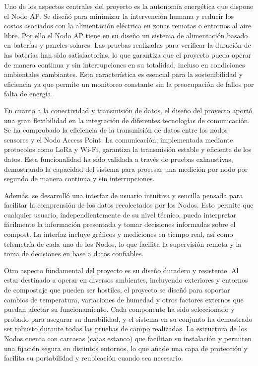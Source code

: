 Uno de los aspectos centrales del proyecto es la autonomía energética que dispone el Nodo AP. Se diseñó para minimizar la intervención humana y reducir los costos asociados con la alimentación eléctrica en zonas remotas o entornos al aire libre. Por ello el Nodo AP tiene en su diseño un sistema de alimentación basado en baterías y paneles solares. Las pruebas realizadas para verificar la duración de las baterías han sido satisfactorias, lo que garantiza que el proyecto pueda operar de manera continua y sin interrupciones en su totalidad, incluso en condiciones ambientales cambiantes. Esta característica es esencial para la sostenibilidad y eficiencia ya que permite un monitoreo constante sin la preocupación de fallos por falta de energía.

En cuanto a la conectividad y transmisión de datos, el diseño del proyecto aportó una gran flexibilidad  en la integración de diferentes tecnologías de comunicación. Se ha comprobado la eficiencia de la transmisión de datos entre los nodos sensores y el Nodo Access Point. La comunicación, implementada mediante protocolos como LoRa y Wi-Fi, garantiza la transmisión estable y eficiente de los datos. Esta funcionalidad ha sido validada a través de pruebas exhaustivas, demostrando la capacidad del sistema para procesar una medición por nodo por segundo de manera continua y sin interrupciones.

Además, se desarrolló una interfaz de usuario intuitiva y sencilla pensada para facilitar la comprensión de los datos recolectados por los Nodos. Esto permite que cualquier usuario, independientemente de su nivel técnico, pueda interpretar fácilmente la información presentada y tomar decisiones informadas sobre el compost. La interfaz incluye gráficos y mediciones en tiempo real, así como telemetría de cada uno de los Nodos, lo que facilita la supervisión remota y la toma de decisiones en base a datos confiables.

Otro aspecto fundamental del proyecto es su diseño duradero y resistente. Al estar destinado a operar en diversos ambientes, incluyendo exteriores y entornos de compostaje que pueden ser hostiles, el proyecto se diseñó para soportar cambios de temperatura, variaciones de humedad y otros factores externos que puedan afectar su funcionamiento. Cada componente ha sido seleccionado y probado para asegurar su durabilidad, y el sistema en su conjunto ha demostrado ser robusto durante todas las pruebas de campo realizadas. La estructura de los Nodos cuenta con carcasas (cajas estanco) que facilitan su instalación y permiten una fijación segura en distintos entornos, lo que añade una capa de protección y facilita su portabilidad y reubicación cuando sea necesario.

